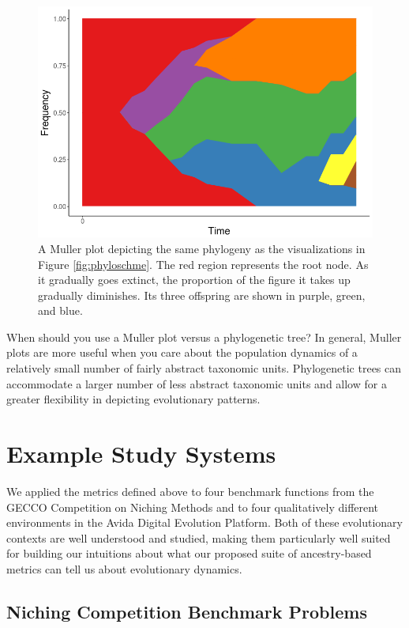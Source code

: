 \documentclass[letterpaper]{article}
\begin{document}
\begin{figure}
    \centering
    \includegraphics[width=\linewidth]{figs/MullerExample-cropped.png}
    \caption{\small A Muller plot depicting the same phylogeny as the visualizations in Figure \ref{fig:phyloschme}. The red region represents the root node. As it gradually goes extinct, the proportion of the figure it takes up gradually diminishes. Its three offspring are shown in purple, green, and blue.}
    \label{fig:mullerscheme}
\end{figure}

When should you use a Muller plot versus a phylogenetic tree? 
In general, Muller plots are more useful when you care about the population dynamics of a relatively small number of fairly abstract taxonomic units.
Phylogenetic trees can accommodate a larger number of less abstract taxonomic units and allow for a greater flexibility in depicting evolutionary patterns.

\section{Example Study Systems}

We applied the metrics defined above to four benchmark functions from the GECCO Competition on Niching Methods \citep{li_benchmark_2013} and to four qualitatively different environments in the Avida Digital Evolution Platform. Both of these evolutionary contexts are well understood and studied, making them particularly well suited for building our intuitions about what our proposed suite of ancestry-based metrics can tell us about evolutionary dynamics.

\subsection{Niching Competition Benchmark Problems}
\end{document}
